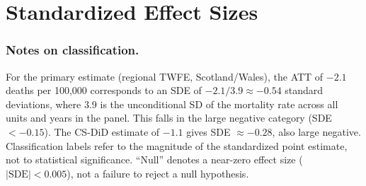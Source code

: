 \documentclass[12pt]{article}
\begin{document}
\section{Standardized Effect Sizes}
\label{sec:sde}



\subsubsection*{Notes on classification.} For the primary estimate (regional TWFE, Scotland/Wales), the ATT of $-2.1$ deaths per 100,000 corresponds to an SDE of $-2.1 / 3.9 \approx -0.54$ standard deviations, where 3.9 is the unconditional SD of the mortality rate across all units and years in the panel. This falls in the large negative category (SDE $< -0.15$). The CS-DiD estimate of $-1.1$ gives SDE $\approx -0.28$, also large negative. Classification labels refer to the magnitude of the standardized point estimate, not to statistical significance. ``Null'' denotes a near-zero effect size ($|\text{SDE}| < 0.005$), not a failure to reject a null hypothesis.
\end{document}
